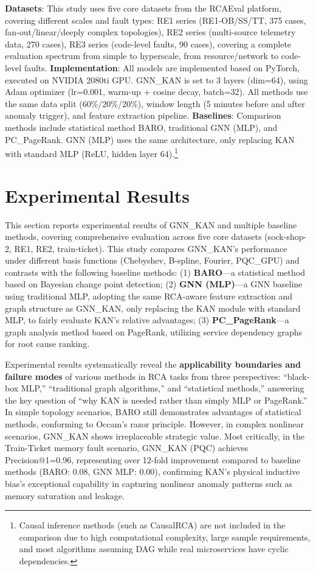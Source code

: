\documentclass[conference]{IEEEtran}
\begin{document}
\textbf{Datasets}: This study uses five core datasets from the RCAEval platform, covering different scales and fault types: RE1 series (RE1-OB/SS/TT, 375 cases, fan-out/linear/deeply complex topologies), RE2 series (multi-source telemetry data, 270 cases), RE3 series (code-level faults, 90 cases), covering a complete evaluation spectrum from simple to hyperscale, from resource/network to code-level faults. \textbf{Implementation}: All models are implemented based on PyTorch, executed on NVIDIA 2080ti GPU. GNN\_KAN is set to 3 layers (dim=64), using Adam optimizer (lr=0.001, warm-up + cosine decay, batch=32). All methods use the same data split (60\%/20\%/20\%), window length (5 minutes before and after anomaly trigger), and feature extraction pipeline. \textbf{Baselines}: Comparison methods include statistical method BARO, traditional GNN (MLP), and PC\_PageRank. GNN (MLP) uses the same architecture, only replacing KAN with standard MLP (ReLU, hidden layer 64).\footnote{Causal inference methods (such as CausalRCA) are not included in the comparison due to high computational complexity, large sample requirements, and most algorithms assuming DAG while real microservices have cyclic dependencies.}

\section{Experimental Results}

This section reports experimental results of GNN\_KAN and multiple baseline methods, covering comprehensive evaluation across five core datasets (sock-shop-2, RE1, RE2, train-ticket). This study compares GNN\_KAN's performance under different basis functions (Chebyshev, B-spline, Fourier, PQC\_GPU) and contrasts with the following baseline methods: (1) \textbf{BARO}---a statistical method based on Bayesian change point detection; (2) \textbf{GNN (MLP)}---a GNN baseline using traditional MLP, adopting the same RCA-aware feature extraction and graph structure as GNN\_KAN, only replacing the KAN module with standard MLP, to fairly evaluate KAN's relative advantages; (3) \textbf{PC\_PageRank}---a graph analysis method based on PageRank, utilizing service dependency graphs for root cause ranking.

Experimental results systematically reveal the \textbf{applicability boundaries and failure modes} of various methods in RCA tasks from three perspectives: ``black-box MLP,'' ``traditional graph algorithms,'' and ``statistical methods,'' answering the key question of ``why KAN is needed rather than simply MLP or PageRank.'' In simple topology scenarios, BARO still demonstrates advantages of statistical methods, conforming to Occam's razor principle. However, in complex nonlinear scenarios, GNN\_KAN shows irreplaceable strategic value. Most critically, in the Train-Ticket memory fault scenario, GNN\_KAN (PQC) achieves Precision@1=0.96, representing over 12-fold improvement compared to baseline methods (BARO: 0.08, GNN MLP: 0.00), confirming KAN's physical inductive bias's exceptional capability in capturing nonlinear anomaly patterns such as memory saturation and leakage.
\end{document}
